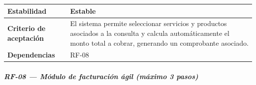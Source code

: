 \documentclass[
]{article}
\newcounter{none} %
\begin{document}
{\def\LTcaptype{none} %
\begin{longtable}[]{@{}
  >{\raggedright\arraybackslash}p{}
  >{\raggedright\arraybackslash}p{}@{}}
\toprule\noalign{}
\begin{minipage}[b]{\linewidth}\raggedright
\textbf{Estabilidad}
\end{minipage} & \begin{minipage}[b]{\linewidth}\raggedright
Estable
\end{minipage} \\
\midrule\noalign{}
\endhead
\bottomrule\noalign{}
\endlastfoot
\textbf{Criterio de aceptación} &
\begin{minipage}[t]{\linewidth}\raggedright
El sistema permite seleccionar servicios y productos asociados a la
consulta y calcula automáticamente el monto total a cobrar, generando un
comprobante asociado.
\end{minipage} \\
\textbf{Dependencias} & \begin{minipage}[t]{\linewidth}\raggedright
RF-08
\end{minipage} \\
\end{longtable}
}

\subparagraph{RF-08 --- Módulo de facturación ágil (máximo 3
pasos)}\label{rf-08-muxf3dulo-de-facturaciuxf3n-uxe1gil-muxe1ximo-3-pasos}
\end{document}
